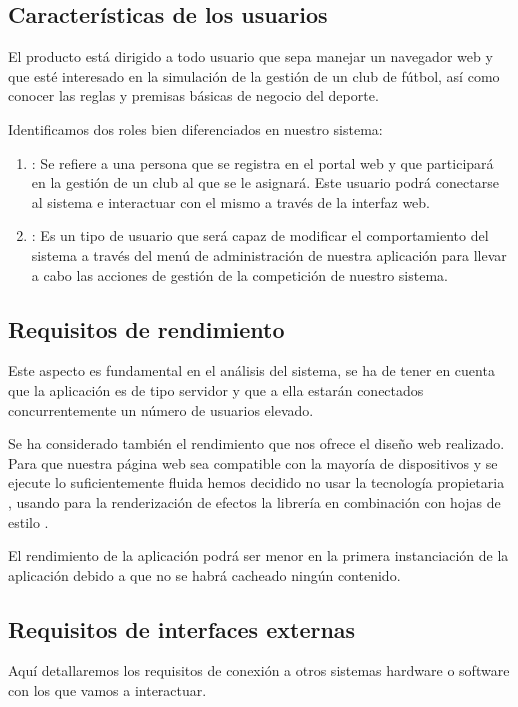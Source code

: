\subsection{Características de los usuarios}
El producto está dirigido a todo usuario que sepa manejar un navegador web y que
esté interesado en la simulación de la gestión de un club de fútbol, así como
conocer las reglas y premisas básicas de negocio del deporte.

Identificamos dos roles bien diferenciados en nuestro sistema:

\begin{enumerate}
\item {}: Se refiere a una persona que se registra en el
  portal web y que participará en la gestión de un club al que se le
  asignará. Este usuario podrá conectarse al sistema e interactuar con el mismo
  a través de la interfaz web.
\item {}: Es un tipo de usuario que será capaz de
  modificar el comportamiento del sistema a través del menú de administración de
  nuestra aplicación para llevar a cabo las acciones de gestión de la
  competición de nuestro sistema.
\end{enumerate}

\subsection{Requisitos de rendimiento}
Este aspecto es fundamental en el análisis del sistema, se ha de tener en cuenta
que la aplicación es de tipo servidor y que a ella estarán conectados
concurrentemente un número de usuarios elevado.

Se ha considerado también el rendimiento que nos ofrece el diseño web
realizado. Para que nuestra página web sea compatible con la mayoría de
dispositivos y se ejecute lo suficientemente fluida hemos decidido no usar la
tecnología propietaria , usando para la renderización de efectos
la librería  en combinación con hojas de estilo .

El rendimiento de la aplicación podrá ser menor en la primera instanciación de
la aplicación debido a que no se habrá cacheado ningún contenido.

\subsection{Requisitos de interfaces externas}
Aquí detallaremos los requisitos de conexión a otros
sistemas hardware o software con los que vamos a interactuar.
